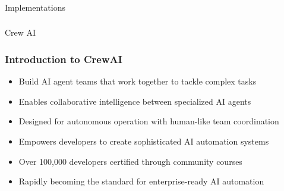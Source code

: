 \begin{frame}[fragile]\frametitle{}
\begin{center}
{\Large Implementations}
\end{center}
\end{frame}

\begin{frame}[fragile]\frametitle{}
\begin{center}
{\Large Crew AI}
\end{center}
\end{frame}

\begin{frame}[fragile]\frametitle{Introduction to CrewAI}
      \begin{itemize}
        \item Build AI agent teams that work together to tackle complex tasks
        \item Enables collaborative intelligence between specialized AI agents
        \item Designed for autonomous operation with human-like team coordination
        \item Empowers developers to create sophisticated AI automation systems
        \item Over 100,000 developers certified through community courses
        \item Rapidly becoming the standard for enterprise-ready AI automation
      \end{itemize}
\end{frame}

